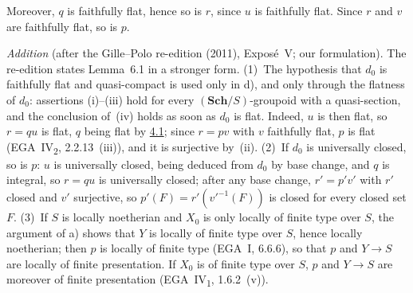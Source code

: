 Moreover, \(q\) is faithfully flat, hence so is \(r\), since \(u\) is
faithfully flat. Since \(r\) and \(v\) are faithfully flat, so is \(p\).

\par\medskip\noindent
\emph{Addition} (after the Gille--Polo re-edition (2011), Exposé~V; our
formulation). The re-edition states Lemma~6.1 in a stronger form.
(1)~The hypothesis that \(d_0\) is faithfully flat and quasi-compact is used
only in d), and only through the flatness of \(d_0\): assertions (i)--(iii)
hold for every \((\mathbf{Sch}/S)\)-groupoid with a quasi-section, and the
conclusion of~(iv) holds as soon as \(d_0\) is flat. Indeed, \(u\) is then
flat, so \(r=qu\) is flat, \(q\) being flat by \hyperref[thm:sga3-V-4.1]{4.1}; since \(r=pv\) with \(v\)
faithfully flat, \(p\) is flat (EGA~IV\textsubscript{2}, 2.2.13~(iii)), and it is
surjective by~(ii). (2)~If \(d_0\) is universally closed, so is \(p\): \(u\) is
universally closed, being deduced from \(d_0\) by base change, and \(q\) is
integral, so \(r=qu\) is universally closed; after any base change, \(r'=p'v'\)
with \(r'\) closed and \(v'\) surjective, so \(p'(F)=r'(v'^{-1}(F))\) is closed for
every closed set \(F\). (3)~If \(S\) is locally noetherian and \(X_0\) is only
locally of finite type over \(S\), the argument of a) shows that \(Y\) is
locally of finite type over \(S\), hence locally noetherian; then \(p\) is
locally of finite type (EGA~I, 6.6.6), so that \(p\) and \(Y\to S\) are locally
of finite presentation. If \(X_0\) is of finite type over \(S\), \(p\) and
\(Y\to S\) are moreover of finite presentation (EGA~IV\textsubscript{1}, 1.6.2~(v)).
\par\medskip
